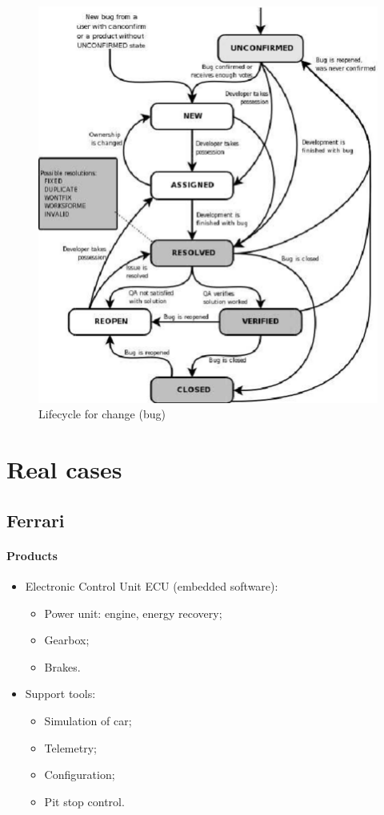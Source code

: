 \begin{figure}[hbtp]
\centering
\includegraphics[scale=0.35]{images/bug_lifecycle.png}
\caption{Lifecycle for change (bug)}
\end{figure}

\section{Real cases}
\subsection{Ferrari}
\paragraph{Products}
\begin{itemize}
\item Electronic Control Unit ECU (embedded software):
\begin{itemize}
\item Power unit: engine, energy recovery;
\item Gearbox;
\item Brakes.
\end{itemize}
\item Support tools:
\begin{itemize}
\item Simulation of car;
\item Telemetry;
\item Configuration;
\item Pit stop control.
\end{itemize}
\end{itemize}

